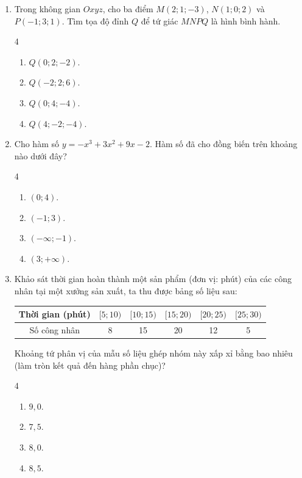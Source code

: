 \documentclass[12pt]{article}
\begin{document}
	\begin{enumerate}[label=\textbf{Câu \arabic*.}, leftmargin=*]
		
		\item Trong không gian $Oxyz$, cho ba điểm $M(2; 1; -3)$, $N(1; 0; 2)$ và $P(-1; 3; 1)$. Tìm tọa độ đỉnh $Q$ để tứ giác $MNPQ$ là hình bình hành.
		\begin{multicols}{4}
			\begin{enumerate}[label=\Alph*.]
				\item $Q(0; 2; -2)$.
				\item $Q(-2; 2; 6)$.
				\item $Q(0; 4; -4)$.
				\item $Q(4; -2; -4)$.
			\end{enumerate}
		\end{multicols}
		
		\item Cho hàm số $y = -x^3 + 3x^2 + 9x - 2$. Hàm số đã cho đồng biến trên khoảng nào dưới đây?
		\begin{multicols}{4}
			\begin{enumerate}[label=\Alph*.]
				\item $(0; 4)$.
				\item $(-1; 3)$.
				\item $(-\infty; -1)$.
				\item $(3; +\infty)$.
			\end{enumerate}
		\end{multicols}
		
		\item Khảo sát thời gian hoàn thành một sản phẩm (đơn vị: phút) của các công nhân tại một xưởng sản xuất, ta thu được bảng số liệu sau:
		\begin{center}
			\renewcommand{\arraystretch}{1.2}
			\begin{tabular}{|c|c|c|c|c|c|}
				\hline
				Thời gian (phút) & $[5; 10)$ & $[10; 15)$ & $[15; 20)$ & $[20; 25)$ & $[25; 30)$ \\
				\hline
				Số công nhân & 8 & 15 & 20 & 12 & 5 \\
				\hline
			\end{tabular}
		\end{center}
		Khoảng tứ phân vị của mẫu số liệu ghép nhóm này xấp xỉ bằng bao nhiêu (làm tròn kết quả đến hàng phần chục)?
		\begin{multicols}{4}
			\begin{enumerate}[label=\Alph*.]
				\item $9,0$.
				\item $7,5$.
				\item $8,0$.
				\item $8,5$.
			\end{enumerate}
		\end{multicols}
		

\end{enumerate}
\end{document}
